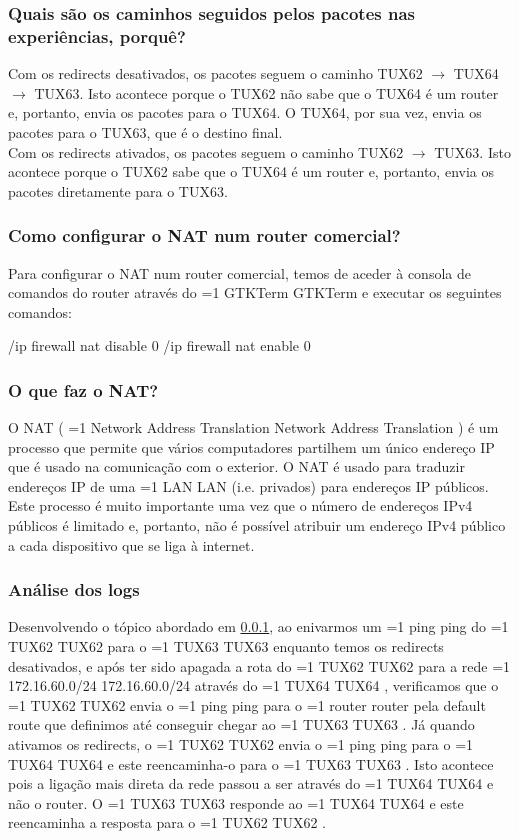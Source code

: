 \documentclass[11pt,a4paper,twocolumn]{article}
\newcommand{\hl}[2][1]{%
  \ifnum#1=1\relax
    \textcolor{text-hl1}{#2}%
  \else
    \textcolor{text-hl2}{#2}%
  \fi
}
\begin{document}
\subsubsection{Quais são os caminhos seguidos pelos pacotes nas experiências, porquê?}\label{sec:exp4-caminhos}

Com os redirects desativados, os pacotes seguem o caminho TUX62 $\rightarrow$ TUX64 $\rightarrow$ TUX63. Isto acontece porque o TUX62 não sabe que o TUX64 é um router e, portanto, envia os pacotes para o TUX64. O TUX64, por sua vez, envia os pacotes para o TUX63, que é o destino final. \\
Com os redirects ativados, os pacotes seguem o caminho TUX62 $\rightarrow$ TUX63. Isto acontece porque o TUX62 sabe que o TUX64 é um router e, portanto, envia os pacotes diretamente para o TUX63.

\subsubsection{Como configurar o NAT num router comercial?}

Para configurar o NAT num router comercial, temos de aceder à consola de comandos do router através do \hl{GTKTerm} e executar os seguintes comandos:
\begin{bash-darktheme}
    /ip firewall nat disable 0
    /ip firewall nat enable 0
\end{bash-darktheme}

\subsubsection{O que faz o NAT?}

O NAT (\hl{Network Address Translation}) é um processo que permite que vários computadores partilhem um único endereço IP que é usado na comunicação com o exterior. O NAT é usado para traduzir endereços IP de uma \hl[2]{LAN} (i.e. privados) para endereços IP públicos.  
Este processo é muito importante uma vez que o número de endereços IPv4 públicos é limitado e, portanto, não é possível atribuir um endereço IPv4 público a cada dispositivo que se liga à internet.

\subsubsection{Análise dos logs}

Desenvolvendo o tópico abordado em \ref{sec:exp4-caminhos}, ao enivarmos um \hl{ping} do \hl[2]{TUX62} para o \hl[2]{TUX63} enquanto temos os redirects desativados, e após ter sido apagada a rota do \hl{TUX62} para a rede \hl{172.16.60.0/24} através do \hl{TUX64}, verificamos que o \hl{TUX62} envia o \hl{ping} para o \hl[2]{router} pela default route que definimos até conseguir chegar ao \hl{TUX63}.
Já quando ativamos os redirects, o \hl{TUX62} envia o \hl{ping} para o \hl{TUX64} e este reencaminha-o para o \hl{TUX63}. Isto acontece pois a ligação mais direta da rede passou a ser através do \hl{TUX64} e não o router. O \hl{TUX63} responde ao \hl{TUX64} e este reencaminha a resposta para o \hl{TUX62}. 
\end{document}
